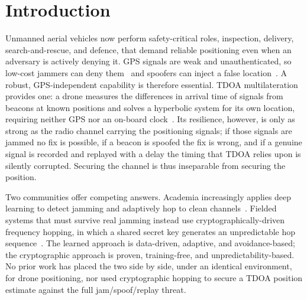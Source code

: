 \documentclass[11pt]{article}
\begin{document}
\section{Introduction}\label{sec:intro}
Unmanned aerial vehicles now perform safety-critical roles, inspection,
delivery, search-and-rescue, and defence, that demand reliable positioning even
when an adversary is actively denying it. GPS signals are weak and
unauthenticated, so low-cost jammers can deny them~\cite{ref18} and spoofers can inject a
false location~\cite{ref24,ref25,ref19}. A robust, GPS-independent capability is
therefore essential. TDOA multilateration provides one: a drone measures the
differences in arrival time of signals from beacons at known positions and
solves a hyperbolic system for its own location, requiring neither GPS nor an
on-board clock~\cite{ref6,ref8,ref30}. Its resilience, however, is only as
strong as the radio channel carrying the positioning signals; if those signals
are jammed no fix is possible, if a beacon is spoofed the fix is wrong, and if a
genuine signal is recorded and replayed with a delay the timing that TDOA relies
upon is silently corrupted. Securing the channel is thus inseparable from
securing the position.

Two communities offer competing answers. Academia increasingly applies deep
learning to detect jamming and adaptively hop to clean
channels~\cite{ref11,ref12,ref13,ref31}. Fielded systems that must survive real
jamming instead use cryptographically-driven frequency hopping, in which a
shared secret key generates an unpredictable hop
sequence~\cite{ref1,ref2,ref17}. The learned approach is data-driven, adaptive,
and avoidance-based; the cryptographic approach is proven, training-free, and
unpredictability-based. No prior work has placed the two side by side, under an
identical environment, for drone positioning, nor used cryptographic hopping to
secure a TDOA position estimate against the full jam/spoof/replay threat.
\end{document}
